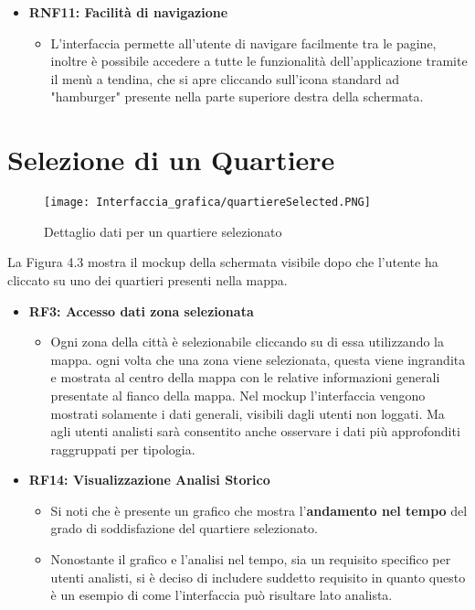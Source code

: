 \begin{itemize}
\begin{itemize}
        \end{itemize}
        \item \textbf{RNF11: Facilità di navigazione} \begin{itemize}
            \item L'interfaccia permette all'utente di navigare facilmente tra le pagine, inoltre è possibile accedere a tutte le funzionalità dell'applicazione tramite il menù a tendina, che si apre cliccando sull'icona standard ad "hamburger" presente nella parte superiore destra della schermata.
            \end{itemize}
    \end{itemize}
\newpage
\section{Selezione di un Quartiere}
    \begin{figure}[H]
        \center
        \texttt{[image: Interfaccia\_grafica/quartiereSelected.PNG]}
        \caption{Dettaglio dati per un quartiere selezionato}
    \end{figure}    

    La Figura 4.3 mostra il mockup della schermata visibile dopo che l'utente ha cliccato su uno dei quartieri presenti nella mappa.

    \begin{itemize}
        \item \textbf{RF3: Accesso dati zona selezionata} \begin{itemize}
            \item Ogni zona della città è selezionabile cliccando su di essa utilizzando la mappa. ogni volta che una zona viene selezionata, questa viene ingrandita e mostrata al centro della mappa con le relative informazioni generali  presentate al fianco della mappa. Nel mockup l'interfaccia vengono mostrati solamente i dati generali, visibili dagli utenti non loggati. Ma agli utenti analisti sarà consentito anche osservare i dati più approfonditi raggruppati per tipologia.
        \end{itemize} 
        \item \textbf{RF14: Visualizzazione Analisi Storico} \begin{itemize}
            \item Si noti che è presente un grafico che mostra l'\textbf{andamento nel tempo} del grado di soddisfazione del quartiere selezionato.
            \item Nonostante il grafico e l'analisi nel tempo, sia un requisito specifico per utenti analisti, si è deciso di includere suddetto requisito in quanto questo è un esempio di come l'interfaccia può risultare lato analista.
        \end{itemize}
    \end{itemize}
